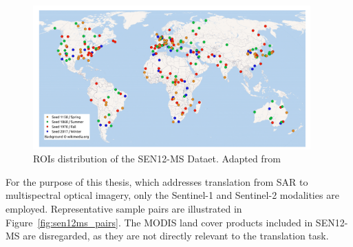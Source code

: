 \begin{figure}[h!]
  \centering
  \includegraphics[width=0.95\textwidth]{img/sen_12_ms_distribution.png}
  \caption[ROIs distribution of the SEN12-MS Dataet]{ROIs distribution of the SEN12-MS Dataet. Adapted from \cite{sen12ms_2019}}
  \label{fig:sen_12_ms_dist}
\end{figure}

For the purpose of this thesis, which addresses translation from SAR to multispectral optical imagery, only the Sentinel-1 and Sentinel-2 modalities are employed. Representative sample pairs are illustrated in Figure~\ref{fig:sen12ms_pairs}. The MODIS land cover products included in SEN12-MS are disregarded, as they are not directly relevant to the translation task.

